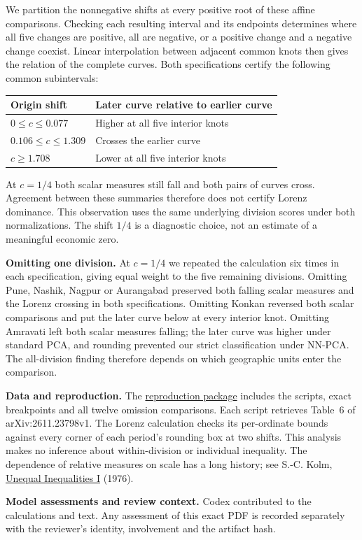 \documentclass[10pt]{article}
\begin{document}
We partition the nonnegative shifts at every positive root of these affine comparisons. Checking each resulting interval and its endpoints determines where all five changes are positive, all are negative, or a positive change and a negative change coexist. Linear interpolation between adjacent common knots then gives the relation of the complete curves. Both specifications certify the following common subintervals:
\begin{center}
\begin{tabular}{ll}\toprule
Origin shift & Later curve relative to earlier curve\\\midrule
$0\le c\le0.077$ & Higher at all five interior knots\\
$0.106\le c\le1.309$ & Crosses the earlier curve\\
$c\ge1.708$ & Lower at all five interior knots\\\bottomrule
\end{tabular}
\end{center}
At $c=1/4$ both scalar measures still fall and both pairs of curves cross. Agreement between these summaries therefore does not certify Lorenz dominance. This observation uses the same underlying division scores under both normalizations. The shift $1/4$ is a diagnostic choice, not an estimate of a meaningful economic zero.

\textbf{Omitting one division.} At $c=1/4$ we repeated the calculation six times in each specification, giving equal weight to the five remaining divisions. Omitting Pune, Nashik, Nagpur or Aurangabad preserved both falling scalar measures and the Lorenz crossing in both specifications. Omitting Konkan reversed both scalar comparisons and put the later curve below at every interior knot. Omitting Amravati left both scalar measures falling; the later curve was higher under standard PCA, and rounding prevented our strict classification under NN-PCA. The all-division finding therefore depends on which geographic units enter the comparison.\par\textbf{Data and reproduction.} The \href{https://github.com/lluiseriksson/THE-ERIKSSON-PROGRAMME/pull/325}{reproduction package} includes the scripts, exact breakpoints and all twelve omission comparisons. Each script retrieves Table~6 of arXiv:2611.23798v1. The Lorenz calculation checks its per-ordinate bounds against every corner of each period's rounding box at two shifts. This analysis makes no inference about within-division or individual inequality. The dependence of relative measures on scale has a long history; see S.-C. Kolm, \href{https://doi.org/10.1016/0022-0531(76)90037-5}{Unequal Inequalities I} (1976).

\textbf{Model assessments and review context.} Codex contributed to the calculations and text. Any assessment of this exact PDF is recorded separately with the reviewer's identity, involvement and the artifact hash.
\end{document}
